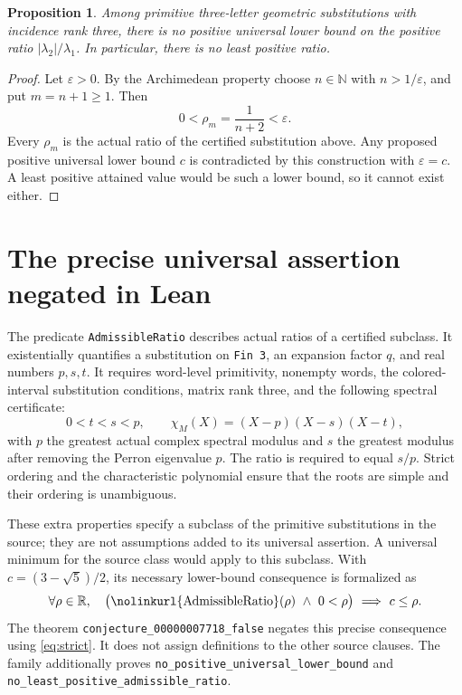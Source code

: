 \documentclass[11pt,a4paper]{article}
\newcommand{\R}{\mathbb R}
\newcommand{\N}{\mathbb N}
\newcommand{\code}[1]{\nolinkurl{#1}}
\newtheorem{proposition}{Proposition}
\begin{document}
\begin{proposition}
Among primitive three-letter geometric substitutions with incidence rank three, there is no positive universal lower bound on the positive ratio $|\lambda_2|/\lambda_1$. In particular, there is no least positive ratio.
\end{proposition}
\begin{proof}
Let $\varepsilon>0$. By the Archimedean property choose $n\in\N$ with $n>1/\varepsilon$, and put $m=n+1\ge1$. Then
\[
0<\rho_m=\frac1{n+2}<\varepsilon.
\]
Every $\rho_m$ is the actual ratio of the certified substitution above. Any proposed positive universal lower bound $c$ is contradicted by this construction with $\varepsilon=c$. A least positive attained value would be such a lower bound, so it cannot exist either.
\end{proof}

\section{The precise universal assertion negated in Lean}
The predicate \code{AdmissibleRatio} describes actual ratios of a certified subclass. It existentially quantifies a substitution on \code{Fin 3}, an expansion factor $q$, and real numbers $p,s,t$. It requires word-level primitivity, nonempty words, the colored-interval substitution conditions, matrix rank three, and the following spectral certificate:
\[
0<t<s<p,\qquad
\chi_M(X)=(X-p)(X-s)(X-t),
\]
with $p$ the greatest actual complex spectral modulus and $s$ the greatest modulus after removing the Perron eigenvalue $p$. The ratio is required to equal $s/p$. Strict ordering and the characteristic polynomial ensure that the roots are simple and their ordering is unambiguous.

These extra properties specify a subclass of the primitive substitutions in the source; they are not assumptions added to its universal assertion. A universal minimum for the source class would apply to this subclass. With $c=(3-\sqrt5)/2$, its necessary lower-bound consequence is formalized as
\[
\forall\rho\in\R,\quad
\bigl(\text{\code{AdmissibleRatio}}(\rho)\ \wedge\ 0<\rho\bigr)
\ \Longrightarrow\ c\le\rho.
\]
The theorem \code{conjecture_00000007718_false} negates this precise consequence using \eqref{eq:strict}. It does not assign definitions to the other source clauses. The family additionally proves \code{no_positive_universal_lower_bound} and \code{no_least_positive_admissible_ratio}.

\newpage
\end{document}
